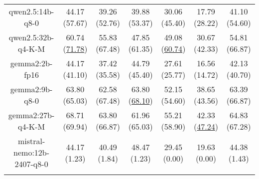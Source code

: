 \begin{table}[hbp]
{\begin{tabular}{ccccccc}
        \multicolumn{1}{c|}{qwen2.5:14b-q8-0} & 44.17 (57.67) & 39.26 (52.76) & \multicolumn{1}{c|}{39.88 (53.37)} & 30.06 (45.40) & \multicolumn{1}{c|}{17.79 (28.22)} & 41.10 (54.60) \\
        

        \multicolumn{1}{c|}{qwen2.5:32b-q4-K-M} & 60.74 (\underline{71.78}) & 55.83 (67.48) & \multicolumn{1}{c|}{47.85 (61.35)} & 49.08 (\underline{60.74}) & \multicolumn{1}{c|}{30.67 (42.33)} & 54.81 (66.87) \\
        

        \multicolumn{1}{c|}{gemma2:2b-fp16} & 44.17 (41.10) & 37.42 (35.58) & \multicolumn{1}{c|}{44.79 (45.40)} & 27.61 (25.77) & \multicolumn{1}{c|}{16.56 (14.72)} & 42.13 (40.70) \\
        

        \multicolumn{1}{c|}{gemma2:9b-q8-0} & 63.80 (65.03) & 62.58 (67.48) & \multicolumn{1}{c|}{63.80 (\underline{68.10})} & 52.15 (54.60) & \multicolumn{1}{c|}{38.65 (43.56)} & 63.39 (66.87) \\
        

        \multicolumn{1}{c|}{gemma2:27b-q4-K-M} & 68.71 (69.94) & 63.80 (66.87) & \multicolumn{1}{c|}{61.96 (65.03)} & 55.21 (58.90) & \multicolumn{1}{c|}{42.33 (\underline{47.24})} & 64.83 (67.28) \\
        

        \multicolumn{1}{c|}{mistral-nemo:12b-2407-q8-0} & 44.17 (1.23) & 40.49 (1.84) & \multicolumn{1}{c|}{48.47 (1.23)} & 29.45 (0.00) & \multicolumn{1}{c|}{19.63 (0.00)} & 44.38 (1.43) \\
        
\\ \hline
\end{tabular}%
}
\end{table}
    